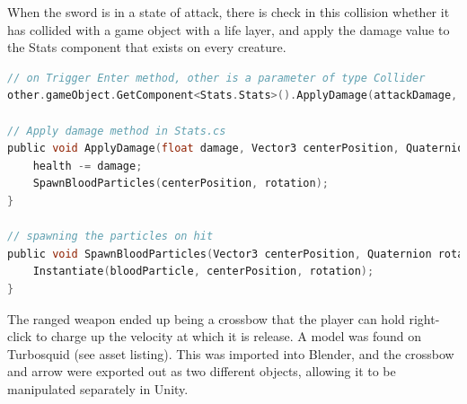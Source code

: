 \documentclass[11pt]{report}
\begin{document}
When the sword is in a state of attack, there is check in this collision whether it has collided with a game object with a life layer, and apply the damage value to the Stats component that exists on every creature.

\begin{lstlisting}[language=c]
// on Trigger Enter method, other is a parameter of type Collider
other.gameObject.GetComponent<Stats.Stats>().ApplyDamage(attackDamage, other.bounds.center, other.transform.rotation);

// Apply damage method in Stats.cs
public void ApplyDamage(float damage, Vector3 centerPosition, Quaternion rotation) {
    health -= damage;
    SpawnBloodParticles(centerPosition, rotation);
}

// spawning the particles on hit
public void SpawnBloodParticles(Vector3 centerPosition, Quaternion rotation) {
    Instantiate(bloodParticle, centerPosition, rotation);
}
\end{lstlisting}

The ranged weapon ended up being a crossbow that the player can hold right-click to charge up the velocity at which it is release. A model was found on Turbosquid (see asset listing). This was imported into Blender, and the crossbow and arrow were exported out as two different objects, allowing it to be manipulated separately in Unity. 
\end{document}

